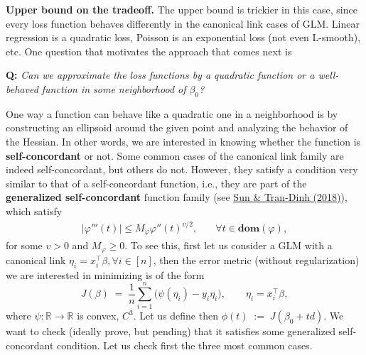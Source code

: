 \documentclass[11pt]{article}
\theoremstyle{plain}
\theoremstyle{definition}
\newcommand{\1}{\mathbf{1}}
\renewcommand{\t}{^{\top}}
\begin{document}
\medskip

\noindent \textbf{Upper bound on the tradeoff.} The upper bound is trickier in this case, since every loss function behaves differently in the canonical link cases of GLM. Linear regression is a quadratic loss, Poisson is an exponential loss (not even L-smooth), etc. One question that motivates the approach that comes next is 

\begin{center}
\textbf{Q:} \textit{Can we approximate the loss functions by a quadratic function or a well-behaved function in some neighborhood of $\beta_0$?}
\end{center}

One way a function can behave like a quadratic one in a neighborhood is by constructing an ellipsoid around the given point and analyzing the behavior of the Hessian. In other words, we are interested in knowing whether the function is \textbf{self-concordant} or not. Some common cases of the canonical link family are indeed self-concordant, but others do not. However, they satisfy a condition very similar to that of a self-concordant function, i.e., they are part of the \textbf{generalized self-concordant} function family (see \href{https://arxiv.org/pdf/1703.04599}{Sun \& Tran-Dinh (2018)}), which satisfy \begin{align}
    |\varphi'''(t)|\leq M_{\varphi} \varphi''(t)^{v/2}, & \quad\forall t \in \mathbf{dom}(\varphi),
\end{align}
for some $v>0$ and $M_{\varphi}\geq0$. 
To see this, first let us consider a GLM with a canonical link $\eta_i = x_i\t \beta, \forall i \in [n]$, then the error metric {\color{red}(without regularization)} we are interested in minimizing is of the form
\[
J(\beta)\;=\;\frac{1}{n}\sum_{i=1}^n \big(\psi(\eta_i)-y_i\eta_i\big),
\qquad \eta_i = x_i^\top \beta,
\]
where $\psi:\mathbb{R}\to\mathbb{R}$ is convex, $C^3$. Let us define then $
\phi(t)\;:=\;J(\beta_0+t d)$. We want to check {\color{red} (ideally prove, but pending)} that it satisfies some generalized self-concordant condition. Let us check first the three most common cases.
\end{document}
